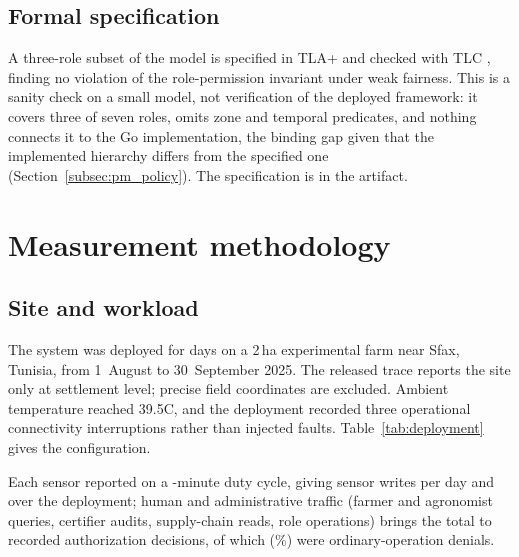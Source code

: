 \documentclass[a4paper,fleqn]{cas-sc}
\begin{document}
\subsection{Formal specification}
\label{subsec:tla}

A three-role subset of the model is specified in TLA+ and checked with TLC
\cite{lamport2002specifying,newcombe2015amazon}, finding no violation of
the role-permission invariant under weak fairness. This is a sanity check
on a small model, not verification of the deployed framework: it covers
three of seven roles, omits zone and temporal predicates, and nothing
connects it to the Go implementation, the binding gap given that the
implemented hierarchy differs from the specified one
(Section~\ref{subsec:pm_policy}). The specification is in the artifact.

\FloatBarrier
\section{Measurement methodology}
\label{sec:method}

\subsection{Site and workload}
\label{subsec:deployment}

The system was deployed for \DeployDays{} days on a 2\,ha experimental
farm near Sfax, Tunisia, from 1~August to 30~September 2025. The released
trace reports the site only at settlement level; precise field coordinates
are excluded. Ambient temperature reached 39.5\textdegree{}C, and the
deployment recorded three operational connectivity interruptions rather
than injected faults. Table~\ref{tab:deployment} gives the configuration.

Each sensor reported on a \DutyCycleMinutes-minute duty cycle, giving
\WritesPerDay{} sensor writes per day and \SensorWrites{} over the
deployment; human and administrative traffic (farmer and agronomist
queries, certifier audits, supply-chain reads, role operations) brings the
total to \TotalDecisions{} recorded authorization decisions, of which
\TotalDenied{} (\DenyRatePct\%) were ordinary-operation denials.
\end{document}

